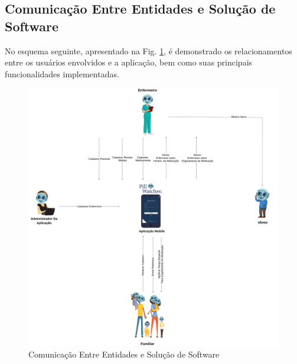 \subsection{Comunicação Entre Entidades e Solução de Software}
No esquema seguinte, apresentado na Fig. \ref{fig:Communication_between_entities}, é demonstrado os relacionamentos entre os usuários envolvidos e a aplicação, bem como suas principais funcionalidades implementadas.
\begin{figure}[H]
    \centering
    \includegraphics[width=\textwidth]{figuras/software/rich_picture/comu_entre_entidades.png}
    \caption{Comunicação Entre Entidades e Solução de Software}
    \label{fig:Communication_between_entities}
\end{figure}